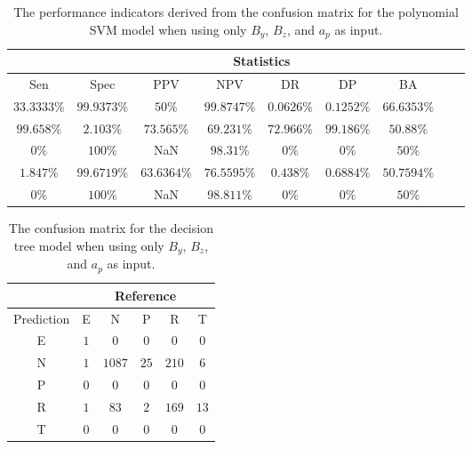 \begin{table}[!ht]
	\centering
	\begin{tabular}{|c|c|c|c|c|c|c|c|c|}
		\hline
		 & \multicolumn{7}{c|}{Statistics} \\ \hline
		Sen & Spec & PPV & NPV & DR & DP & BA \\ \hline
		$33.3333\%$ & $99.9373\%$ & $50\%$ & $99.8747\%$ & $0.0626\%$ & $0.1252\%$ & $66.6353\%$ \\ \hline
		$99.658\%$ & $2.103\%$ & $73.565\%$ & $69.231\%$ & $72.966\%$ & $99.186\%$ & $50.88\%$ \\ \hline
		$0\%$ & $100\%$ & NaN & $98.31\%$ & $0\%$ & $0\%$ & $50\%$ \\ \hline
		$1.847\%$ & $99.6719\%$ & $63.6364\%$ & $76.5595\%$ & $0.438\%$ & $0.6884\%$ & $50.7594\%$ \\ \hline
		$0\%$ & $100\%$ & NaN & $98.811\%$ & $0\%$ & $0\%$ & $50\%$ \\ \hline
	\end{tabular}
	\caption{The performance indicators derived from the confusion matrix for the polynomial SVM model when using only $B_{y}$, $B_{z}$, and $a_{p}$ as input.}
	\label{tab:cs:yzap:svmPoly}
\end{table}

\begin{table}[!ht]
	\centering
	\begin{tabular}{|c|c|c|c|c|c|}
		\hline
		 & \multicolumn{5}{|c|}{Reference} \\ \hline
		 Prediction & E & N & P & R & T \\ \hline
		 E & $1$ & $0$ & $0$ & $0$ & $0$ \\ \hline
		 N & $1$ & $1087$ & $25$ & $210$ & $6$ \\ \hline
		 P & $0$ & $0$ & $0$ & $0$ & $0$ \\ \hline
		 R & $1$ & $83$ & $2$ & $169$ & $13$ \\ \hline
		 T & $0$ & $0$ & $0$ & $0$ & $0$ \\ \hline
	\end{tabular}
	\caption{The confusion matrix for the decision tree model when using only $B_{y}$, $B_{z}$, and $a_{p}$ as input.}
	\label{tab:cm:yzap:C5.0}
\end{table}

